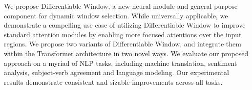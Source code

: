 We propose Differentiable Window, a new neural module and general purpose component for dynamic window selection. While universally applicable, we demonstrate a compelling use case of utilizing Differentiable Window to improve standard attention modules by enabling more focused attentions over the input regions. We propose two variants of Differentiable Window, and integrate them within the Transformer architecture in two novel ways. We evaluate our proposed approach on a myriad of NLP tasks, including machine translation, sentiment analysis, subject-verb agreement and language modeling. Our experimental results demonstrate consistent and sizable improvements across all tasks.
